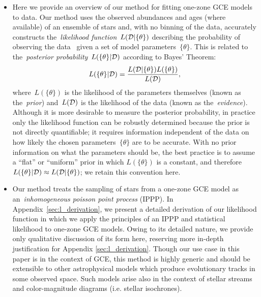 \documentclass[ms.tex]{subfiles}
\begin{document}
\begin{itemize}

	\item Here we provide an overview of our method for fitting one-zone GCE
	models to data.
	Our method uses the observed abundances and ages (where available) of an
	ensemble of stars and, with no binning of the data, accurately constructs
	the~\textit{likelihood function}~$L(\mathcal{D} | \{\theta\})$ describing
	the probability of observing the data~ given a set of model
	parameters~$\{\theta\}$.
	This is related to the~\textit{posterior probability}~$L(\{\theta\} |
	\mathcal{D})$ according to Bayes' Theorem:
	\begin{equation}
	L(\{\theta\} | \mathcal{D}) = \frac{
		L(\mathcal{D} | \{\theta\}) L(\{\theta\})
	}{
		L(\mathcal{D})
	},
	\end{equation}
	where~$L(\{\theta\})$ is the likelihood of the parameters themselves
	(known as the~\textit{prior}) and~$L(\mathcal{D})$ is the likelihood of the
	data (known as the~\textit{evidence}).
	Although it is more desirable to measure the posterior probability,
	in practice only the likelihood function can be robustly determined
	because the prior is not directly quantifiable; it requires information
	independent of the data on how likely the chosen parameters~$\{\theta\}$
	are to be accurate.
	With no prior information on what the parameters should be, the best
	practice is to assume a ``flat'' or ``uniform'' prior in which
	$L(\{\theta\})$ is a constant, and therefore
	$L(\{\theta\} | \mathcal{D}) \approx L(\mathcal{D} | \{\theta\})$; we retain
	this convention here.

	\item Our method treats the sampling of stars from a one-zone GCE model
	as an~\textit{inhomogeneous poisson point process} (IPPP).
	In Appendix~\ref{sec:l_derivation}, we present a detailed derivation of
	our likelihood function in which we apply the principles of an IPPP and
	statistical likelihood to one-zone GCE models.
	Owing to its detailed nature, we provide only qualitative discussion of
	its form here, reserving more in-depth justification for Appendix
	\ref{sec:l_derivation}.
	Though our use case in this paper is in the context of GCE, this method
	is highly generic and should be extensible to other astrophysical models
	which produce evolutionary tracks in some observed space.
	Such models arise also in the context of stellar streams and
	color-magnitude diagrams (i.e. stellar isochrones).


\end{itemize}
\end{document}
